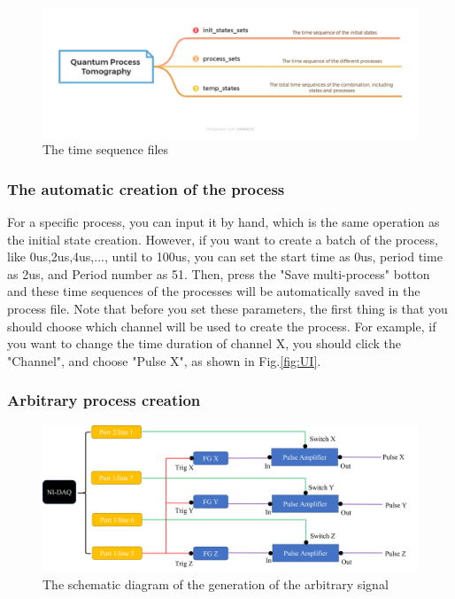\documentclass{article}
\begin{document}
\begin{figure}[htbp]
    \centering
    \includegraphics[width=0.9\linewidth]{fig/QPT.pdf}
    \caption{The time sequence files}
    \label{fig: time sequence files}
\end{figure}

\subsubsection{The automatic creation of the process}
For a specific process, you can input it by hand, which is the same operation as the initial state creation. However, if you want to create a batch of the process, like 0us,2us,4us,..., until to 100us, you can set the start time as 0us, period time as 2us, and Period number as 51. Then, press the "Save multi-process" botton and these time sequences of the processes will be automatically saved in the process file. Note that before you set these parameters, the first thing is that you should choose which channel will be used to create the process. For example, if you want to change the time duration of channel X, you should click the "Channel", and choose "Pulse X", as shown in Fig.\ref{fig:UI}.

\subsubsection{Arbitrary process creation}

\begin{figure}[htbp]
    \centering
    \includegraphics[width=0.9\linewidth]{fig/Arb Gen.png}
    \caption{The schematic diagram of the generation of the arbitrary signal}
    \label{fig: arbitrary signal generation}
\end{figure}
\end{document}
